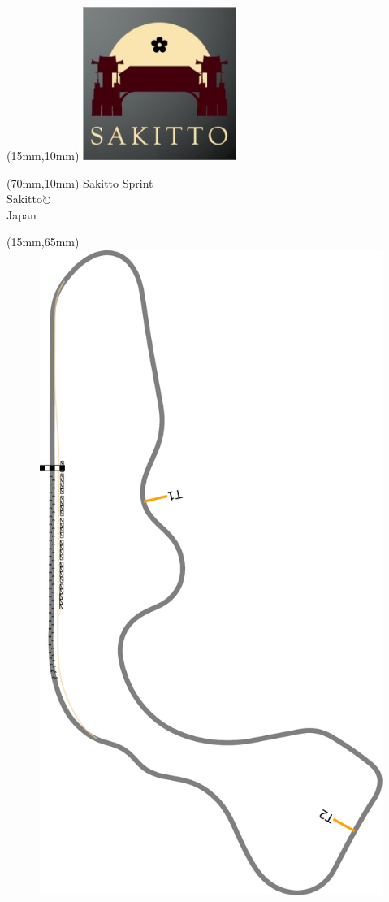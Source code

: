 \null\newpage
\begin{textblock*}{50mm}(15mm,10mm)%
\includegraphics[width=50mm]{LG/2015-05-20_00093.png}
\end{textblock*}
\begin{textblock*}{130mm}(70mm,10mm)%
{\fontsize{20}{20}\selectfont Sakitto Sprint\\}
{\fontsize{16}{16}\selectfont Sakitto\hfill \Large$\circlearrowright$\\}
{\fontsize{12}{12}\selectfont Japan\\}
\end{textblock*}
\begin{textblock*}{185mm}(15mm,65mm)%
\centering
\mbox{\includegraphics[width=185mm,height=210mm,keepaspectratio]{PT/SASP.pdf}}
\end{textblock*}
